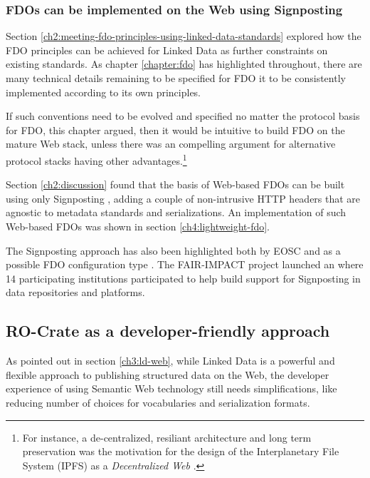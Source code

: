 \subsubsection{FDOs can be implemented on the Web using Signposting}
\label{ch61:signposting}

Section \vref{ch2:meeting-fdo-principles-using-linked-data-standards} explored how the FDO principles can be achieved for Linked Data as further constraints on existing standards.
As chapter \ref{chapter:fdo} has highlighted throughout, there are many technical details remaining to be specified for FDO it to be consistently implemented according to its own principles.

If such conventions need to be evolved and specified no matter the protocol basis for FDO, this chapter argued, then it would be intuitive to build FDO on the mature Web stack, unless there was an compelling argument for alternative protocol stacks having other advantages.\footnote{
  For instance, a de-centralized, resiliant architecture and long term preservation was the motivation for the design of the Interplanetary File System (IPFS) as a \emph{Decentralized Web} \cite{Trautwein 2022}.
}

Section \ref{ch2:discussion} found that the basis of Web-based FDOs can be built using only Signposting \cite{vandesompel2015,Van de Sompel 2022}, adding a couple of non-intrusive HTTP headers that are agnostic to metadata standards and serializations. An implementation of such Web-based FDOs was shown in section \ref{ch4:lightweight-fdo}. 

The Signposting approach has also been highlighted both by EOSC \cite{10.5281/zenodo.7463421} and as a possible FDO configuration type \cite{fdo-ConfigurationTypes}.
The FAIR-IMPACT project launched an  where 14 participating institutions participated to help build support for Signposting \cite{soilandreyes2023b} in data repositories and platforms.



\subsection{RO-Crate as a developer-friendly approach}
\label{ch61:crate}

As pointed out in section \vref{ch3:ld-web}, while Linked Data is a powerful and flexible approach to publishing structured data on the Web, the developer experience of using Semantic Web technology still needs simplifications, like reducing number of choices for vocabularies and serialization formats. 

